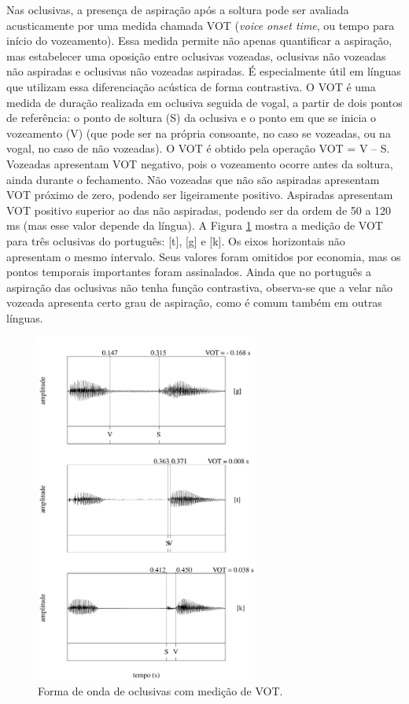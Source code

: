 \documentclass[portuguese]{textolivre}
\begin{document}
Nas oclusivas, a presença de aspiração após a soltura pode ser avaliada acusticamente por uma medida chamada VOT (\textit{voice onset time}, ou tempo para início do vozeamento). Essa medida permite não apenas quantificar a aspiração, mas estabelecer uma oposição entre oclusivas vozeadas, oclusivas não vozeadas não aspiradas e oclusivas não vozeadas aspiradas. É especialmente útil em línguas que utilizam essa diferenciação acústica de forma contrastiva. O VOT é uma medida de duração realizada em oclusiva seguida de vogal, a partir de dois pontos de referência: o ponto de soltura (S) da oclusiva e o ponto em que se inicia o vozeamento (V) (que pode ser na própria consoante, no caso se vozeadas, ou na vogal, no caso de não vozeadas). O VOT é obtido pela operação VOT = V -- S. Vozeadas apresentam VOT negativo, pois o vozeamento ocorre antes da soltura, ainda durante o fechamento. Não vozeadas que não são aspiradas apresentam VOT próximo de zero, podendo ser ligeiramente positivo. Aspiradas apresentam VOT positivo superior ao das não aspiradas, podendo ser da ordem de 50 a 120 ms (mas esse valor depende da língua). A Figura \ref{fig16} mostra a medição de VOT para três oclusivas do português: [t], [g] e [k]. Os eixos horizontais não apresentam o mesmo intervalo. Seus valores foram omitidos por economia, mas os pontos temporais importantes foram assinalados. Ainda que no português a aspiração das oclusivas não tenha função contrastiva, observa-se que a velar não vozeada apresenta certo grau de aspiração, como é comum também em outras línguas.  

\begin{figure}[H]
 \centering
 \includegraphics[width=0.65\textwidth]{Fig16.pdf}
 \caption{Forma de onda de oclusivas com medição de VOT.}
 \label{fig16}
\end{figure}
\end{document}

